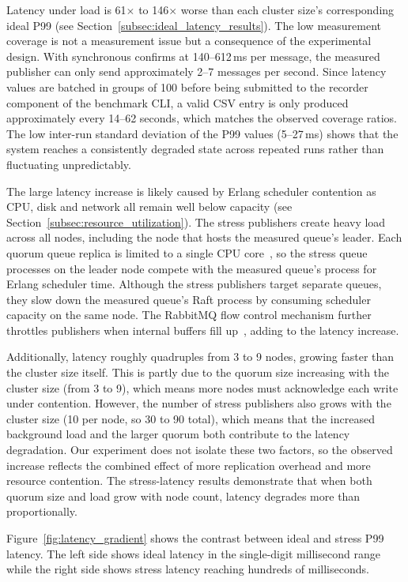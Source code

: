 Latency under load is 61$\times$ to 146$\times$ worse than each cluster size's corresponding ideal P99 (see Section~\ref{subsec:ideal_latency_results}). The low measurement coverage is not a measurement issue but a consequence of the experimental design. With synchronous confirms at 140--612\,ms per message, the measured publisher can only send approximately 2--7 messages per second. Since latency values are batched in groups of 100 before being submitted to the recorder component of the benchmark CLI, a valid CSV entry is only produced approximately every 14--62 seconds, which matches the observed coverage ratios. The low inter-run standard deviation of the P99 values (5--27\,ms) shows that the system reaches a consistently degraded state across repeated runs rather than fluctuating unpredictably.

The large latency increase is likely caused by Erlang scheduler contention as CPU, disk and network all remain well below capacity (see Section~\ref{subsec:resource_utilization}). The stress publishers create heavy load across all nodes, including the node that hosts the measured queue's leader. Each quorum queue replica is limited to a single CPU core~\cite{rmq_queues_docs}, so the stress queue processes on the leader node compete with the measured queue's process for Erlang scheduler time. Although the stress publishers target separate queues, they slow down the measured queue's Raft process by consuming scheduler capacity on the same node. The RabbitMQ flow control mechanism further throttles publishers when internal buffers fill up~\cite{rmq_flow_control_docs}, adding to the latency increase.

Additionally, latency roughly quadruples from 3 to 9 nodes, growing faster than the cluster size itself. This is partly due to the quorum size increasing with the cluster size (from 3 to 9), which means more nodes must acknowledge each write under contention. However, the number of stress publishers also grows with the cluster size (10 per node, so 30 to 90 total), which means that the increased background load and the larger quorum both contribute to the latency degradation. Our experiment does not isolate these two factors, so the observed increase reflects the combined effect of more replication overhead and more resource contention. The stress-latency results demonstrate that when both quorum size and load grow with node count, latency degrades more than proportionally.

Figure~\ref{fig:latency_gradient} shows the contrast between ideal and stress P99 latency. The left side shows ideal latency in the single-digit millisecond range while the right side shows stress latency reaching hundreds of milliseconds.

